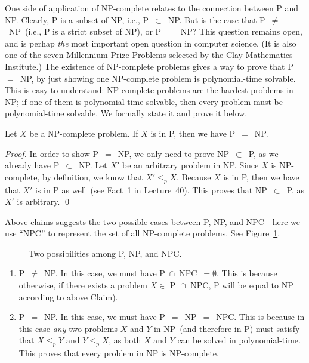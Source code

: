 One side of application of NP-complete relates to the connection between P and NP.
Clearly, P is a subset of NP, i.e., P{}~$\subset${}~NP.
But is the case that P{}~$\neq${}~NP~(i.e., P is a strict subset of NP),
or P{}~$=${}~NP?  This question remains open,
and is perhap \emph{the} most important open question in computer science.
(It is also one of the seven Millennium Prize Problems selected by the Clay Mathematics Institute.)
The existence of NP-complete problems gives a way to prove that P{}~$=${}~NP, by just showing
one NP-complete problem is polynomial-time solvable. This is easy to understand: NP-complete
problems are the hardest problems in NP; if one of them is polynomial-time solvable,
then every problem must be polynomial-time solvable. We formally state it and prove it below.

\begin{claim}
Let $X$ be a NP-complete problem. If $X$ is in P, then we have P{}~$=${}~NP.
\end{claim}

\emph{Proof.} 	
In order to show P{}~$=${}~NP, we only need to prove NP{}~$\subset${}~P, as we already have P{}~$\subset${}~NP. 
Let $X'$ be an arbitrary problem in NP.  
Since $X$ is NP-complete, by definition, we know that $X'\le_p X$. Because
$X$ is in P, then we have that $X'$ is in P as well~(see Fact~1 in Lecture~40).
This proves that NP{}~$\subset${}~P, as $X'$ is arbitrary.  \qed

Above claims suggests the two possible cases between P, NP, and NPC---here we use ``NPC''
to represent the set of all NP-complete problems. See Figure~\ref{fig:PvsNP}.

\begin{figure}[!h]
\centering{}
\caption{Two possibilities among P, NP, and NPC.}
\label{fig:PvsNP}
\end{figure}

\vspace*{-\topsep}
\begin{enumerate}
\item P{}~$\neq${}~NP. In this case, we must have P{}~$\cap${}~NPC{}~$=\emptyset$. This is
because otherwise, if there exists a problem $X\in \textrm{ P } \cap \textrm{ NPC}$, P will be equal to NP according to above Claim). 
\item P{}~$=${}~NP. In this case, we must have P{}~$=${}~NP{}~$=${}~NPC. 
This is because in this case \emph{any} two problems $X$ and $Y$ in NP~(and therefore in P)
must satisfy that $X\le_p Y$ and $Y\le_p X$, as both $X$ and $Y$ can be solved in polynomial-time.
This proves that every problem in NP is NP-complete.
\end{enumerate}

